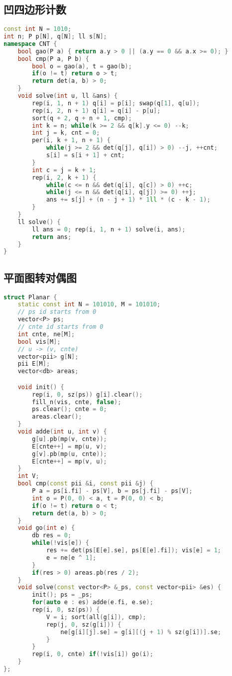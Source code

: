 \subsection{凹四边形计数}
\begin{lstlisting}[language=C++]
const int N = 1010;
int n; P p[N], q[N]; ll s[N];
namespace CNT {
	bool gao(P a) { return a.y > 0 || (a.y == 0 && a.x >= 0); }
	bool cmp(P a, P b) {
		bool o = gao(a), t = gao(b);
		if(o != t) return o > t;
		return det(a, b) > 0;
	}
	void solve(int u, ll &ans) {
		rep(i, 1, n + 1) q[i] = p[i]; swap(q[1], q[u]);
		rep(i, 2, n + 1) q[i] = q[i] - p[u];
		sort(q + 2, q + n + 1, cmp);
		int k = n; while(k >= 2 && q[k].y <= 0) --k;
		int j = k, cnt = 0;
		per(i, k + 1, n + 1) {
			while(j >= 2 && det(q[j], q[i]) > 0) --j, ++cnt;
			s[i] = s[i + 1] + cnt;
		}
		int c = j = k + 1;
		rep(i, 2, k + 1) {
			while(c <= n && det(q[i], q[c]) > 0) ++c;
			while(j <= n && det(q[i], q[j]) >= 0) ++j;
			ans += s[j] + (n - j + 1) * 1ll * (c - k - 1);
		}
	}
	ll solve() {
		ll ans = 0; rep(i, 1, n + 1) solve(i, ans);
		return ans;
	}
}
\end{lstlisting}
\subsection{平面图转对偶图}
\begin{lstlisting}[language=C++]
struct Planar {
	static const int N = 101010, M = 101010;
	// ps id starts from 0
	vector<P> ps;
	// cnte id starts from 0
	int cnte, ne[M];
	bool vis[M];
	// u -> (v, cnte)
	vector<pii> g[N];
	pii E[M];
	vector<db> areas;

	void init() {
		rep(i, 0, sz(ps)) g[i].clear();
		fill_n(vis, cnte, false);
		ps.clear(); cnte = 0;
		areas.clear();
	}
	void adde(int u, int v) {
		g[u].pb(mp(v, cnte));
		E[cnte++] = mp(u, v);
		g[v].pb(mp(u, cnte));
		E[cnte++] = mp(v, u);
	}
	int V;
	bool cmp(const pii &i, const pii &j) {
		P a = ps[i.fi] - ps[V], b = ps[j.fi] - ps[V];
		int o = P(0, 0) < a, t = P(0, 0) < b;
		if(o != t) return o < t;
		return det(a, b) > 0;
	}
	void go(int e) {
		db res = 0;
		while(!vis[e]) {
			res += det(ps[E[e].se], ps[E[e].fi]); vis[e] = 1;
			e = ne[e ^ 1];
		}
		if(res > 0) areas.pb(res / 2);
	}
	void solve(const vector<P> &_ps, const vector<pii> &es) {
		init(); ps = _ps;
		for(auto e : es) adde(e.fi, e.se);
		rep(i, 0, sz(ps)) {
			V = i; sort(all(g[i]), cmp);
			rep(j, 0, sz(g[i])) {
				ne[g[i][j].se] = g[i][(j + 1) % sz(g[i])].se;
			}
		}
		rep(i, 0, cnte) if(!vis[i]) go(i);
	}
};
\end{lstlisting}
